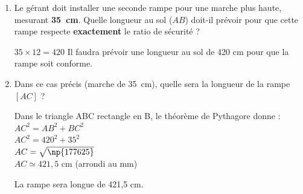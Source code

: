 \documentclass[a4paper]{book}
\begin{document}
{\begin{exercice}
\begin{enumerate}[resume,leftmargin=*]
            \begin{ZoneReponse}{1cm}
                $210\div20=10,5$ \hspace{1cm} Pour 1 cm de hauteur, il y a 10,5 cm au sol. La rampe n'est pas conforme.
            \end{ZoneReponse}

            \item Le gérant doit installer une seconde rampe pour une marche plus haute, mesurant \textbf{35~cm}. Quelle longueur au sol ($AB$) doit-il prévoir pour que cette rampe respecte \textbf{exactement} le ratio de sécurité ?
            
            \begin{ZoneReponse}{1cm}
                $35\times12=420$ \hspace{1cm} Il faudra prévoir une longueur au sol de 420 cm pour que la rampe soit conforme.
            \end{ZoneReponse}
            
            \item Dans ce cas précis (marche de 35~cm), quelle sera la longueur de la rampe $[AC]$ ?

            \begin{ZoneReponse}{3cm}
                Dans le triangle ABC rectangle en B, le théorème de Pythagore donne : \\
                $AC^2=AB^2+BC^2$\\
                $AC^2=420^2+35^2$\\
                $AC=\sqrt{\np{177625}}$\\
                $AC\simeq421,5$ cm (arrondi au mm)

                La rampe sera longue de 421,5 cm.
            \end{ZoneReponse}
        \end{enumerate}
    \end{exercice}

}
\end{document}
